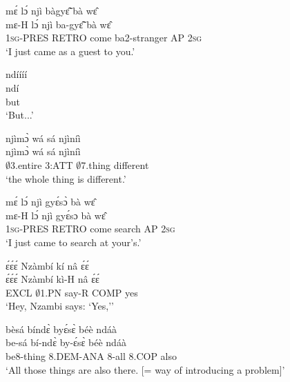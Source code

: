 \begin{exe} 
\exN\label{117}
  \glll mɛ́ lɔ́ njì bàgyɛ̃̂ bà wɛ̂ \\
       mɛ-H lɔ́ njì ba-gyɛ̃̂ bà wɛ̂ \\
       1\textsc{sg}-PRES RETRO come ba2-stranger AP 2\textsc{sg}  \\
    \trans `I just came as a guest to you.'
\end{exe}

\begin{exe} 
\exN\label{118}
  \glll ndíííí \\
        ndí \\
        but \\
    \trans `But...'
\end{exe}

\begin{exe} 
\exN\label{119}
  \glll njìmɔ̀ wá sá njìníì \\
        njìmɔ̀ wá sá njìníì \\
        $\emptyset$3.entire 3:ATT $\emptyset$7.thing different \\
    \trans `the whole thing is different.'
\end{exe}

\begin{exe} 
\exN\label{120}
  \glll mɛ́ lɔ́ njì gyɛ́sɔ̀ bà wɛ̂ \\
       mɛ-H lɔ́ njì gyɛ́sɔ bà wɛ̂ \\
       1\textsc{sg}-PRES RETRO come search AP 2\textsc{sg}  \\
    \trans `I just came to search at your's.'
\end{exe}

\begin{exe} 
\exN\label{121}
  \glll ɛ́ɛ́ɛ́ Nzàmbí kí nâ ɛ́ɛ́ \\
       ɛ́ɛ́ɛ́ Nzàmbí kì-H nâ ɛ́ɛ́ \\
       EXCL $\emptyset$1.PN say-R COMP yes  \\
    \trans `Hey, Nzambi says: `Yes,''
\end{exe}

\begin{exe} 
\exN\label{122} 
  \glll bèsá bíndɛ̀ byɛ́sɛ̀ béè ndáà \\
       be-sá bí-ndɛ̀ by-ɛ́sɛ̀ béè ndáà \\
        be8-thing 8.DEM-ANA 8-all 8.COP also \\
    \trans `All those things are also there. [= way of introducing a problem]'
\end{exe}

